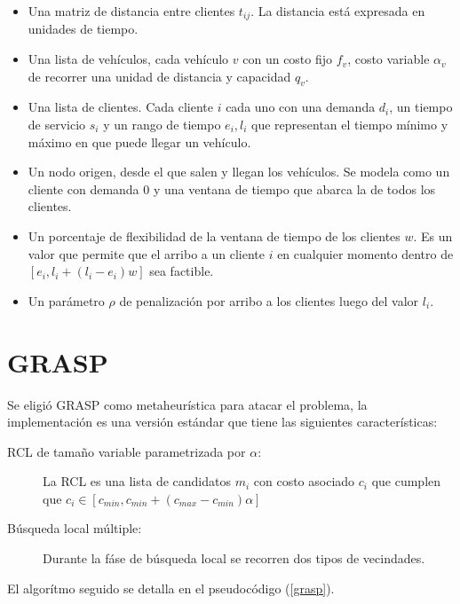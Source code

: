 \documentclass{article}
\begin{document}
  \begin{itemize}
    \item Una matriz de distancia entre clientes $t_{ij}$. La distancia está expresada en unidades de tiempo.
    \item Una lista de vehículos, cada vehículo $v$ con un costo fijo $f_v$, costo variable $\alpha_v$ de recorrer una unidad de distancia y capacidad $q_v$.
    \item Una lista de clientes. Cada cliente $i$ cada uno con una demanda $d_i$, un tiempo de servicio $s_i$ y un rango de tiempo $e_i, l_i$ que representan el tiempo mínimo y máximo en que puede llegar un vehículo.
    \item Un nodo origen, desde el que salen y llegan los vehículos. Se modela como un cliente con demanda 0 y una ventana de tiempo que abarca la de todos los clientes.
    \item Un porcentaje de flexibilidad de la ventana de tiempo de los clientes $w$. Es un valor que permite que el arribo a un cliente $i$ en cualquier momento dentro de $[e_i, l_i + (l_i - e_i)w]$ sea factible.
    \item Un parámetro $\rho$ de penalización por arribo a los clientes luego del valor $l_i$.
  \end{itemize}

  \section*{GRASP}
  
  Se eligió GRASP como metaheurística para atacar el problema, la implementación es una versión estándar que tiene las siguientes características:

  \begin{description}
    \item[RCL de tamaño variable parametrizada por $\alpha$:] La RCL es una lista de candidatos $m_i$ con costo asociado $c_i$ que cumplen que $c_i \in [c_{min}, c_{min} + (c_{max} - c_{min}) \alpha]$
    \item[Búsqueda local múltiple:] Durante la fáse de búsqueda local se recorren dos tipos de vecindades.
  \end{description}

  El algorítmo seguido se detalla en el pseudocódigo (\ref{grasp}).
\end{document}

